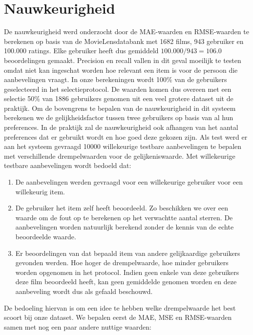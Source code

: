 \section{Nauwkeurigheid}
De nauwkeurigheid werd onderzocht door de MAE-waarden en RMSE-waarden te berekenen op basis van de MovieLensdatabank met 1682 films, 943 gebruiker en 100.000 ratings. Elke gebruiker heeft dus gemiddeld $100.000/943 =106.0$ beoordelingen gemaakt. Precision en recall vallen in dit geval moeilijk te testen omdat niet kan ingeschat worden hoe relevant een item is voor de persoon die aanbevelingen vraagt. In onze berekeningen wordt 100\% van de gebruikers geselecteerd in het selectieprotocol. De waarden komen dus overeen met een selectie 50\% van 1886 gebruikers genomen uit een veel grotere dataset uit de praktijk. Om de bovengrens te bepalen van de nauwkeurigheid in dit systeem berekenen we de gelijkheidsfactor tussen twee gebruikers op basis van al hun preferences. In de praktijk zal de nauwkeurigheid ook afhangen van het aantal preferences dat er gebruikt wordt en hoe goed deze gekozen zijn. Als test werd er aan het systeem gevraagd 10000 willekeurige testbare aanbevelingen te bepalen met verschillende drempelwaarden voor de gelijkeniswaarde. Met willekeurige testbare aanbevelingen wordt bedoeld dat: 
\begin{enumerate}
\item De aanbevelingen werden gevraagd voor een willekeurige gebruiker voor een willekeurig item.
\item De gebruiker het item zelf heeft beoordeeld. Zo beschikken we over een waarde om de fout op te berekenen op het verwachtte aantal sterren. De aanbevelingen worden natuurlijk berekend zonder de kennis van de echte beoordeelde waarde.
\item Er beoordelingen van dat bepaald item van andere gelijkaardige gebruikers gevonden werden. Hoe hoger de drempelwaarde, hoe minder gebruikers worden opgenomen in het protocol. Indien geen enkele van deze gebruikers deze film beoordeeld heeft, kan geen gemiddelde genomen worden en deze aanbeveling wordt dus als gefaald beschouwd.
\end{enumerate}

\pagebreak
De bedoeling hiervan is om een idee te hebben welke drempelwaarde het best scoort bij onze dataset. We bepalen eerst de MAE, MSE en RMSE-waarden samen met nog een paar andere nuttige waarden:

